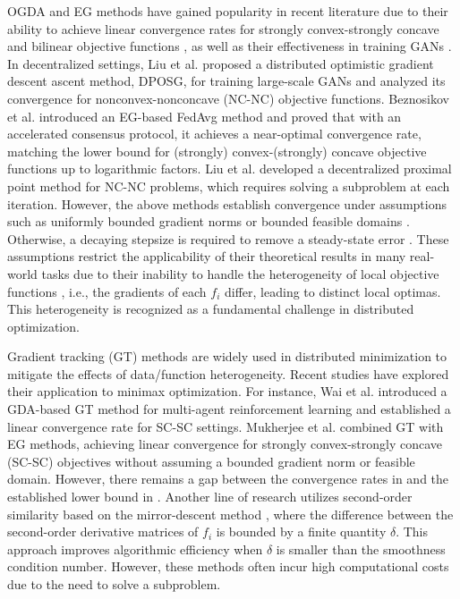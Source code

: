 \documentclass[10pt,a4paper]{amsart}
\begin{document}
OGDA and EG methods have gained popularity in recent literature due to their ability to achieve linear convergence rates for strongly convex-strongly concave and bilinear objective functions \cite{mokhtari2020unified, azizian2020tight}, as well as their effectiveness in training GANs \cite{daskalakis2017training, liang2019interaction}.
In decentralized settings, Liu et al. \cite{liu2020decentralized} proposed a distributed optimistic gradient descent ascent method, DPOSG, for training large-scale GANs and analyzed its convergence for nonconvex-nonconcave (NC-NC) objective functions.
Beznosikov et al. \cite{beznosikov2020distributed} introduced an EG-based FedAvg method and proved that with an accelerated consensus protocol, it achieves a near-optimal convergence rate, matching the lower bound for (strongly) convex-(strongly) concave objective functions up to logarithmic factors.
Liu et al. \cite{liu2019decentralized} developed a decentralized proximal point method for NC-NC problems, which requires solving a subproblem at each iteration.
However, the above methods establish convergence under assumptions such as uniformly bounded gradient norms \cite{liu2020decentralized} or bounded feasible domains \cite{liu2019decentralized, beznosikov2020distributed}. 
Otherwise, a decaying stepsize is required to remove a steady-state error \cite{cai2024diffusion}.
These assumptions restrict the applicability of their theoretical results in many real-world tasks due to their inability to handle the heterogeneity of local objective functions \cite{lian2017can}, i.e., the gradients of each $f_i$ differ, leading to distinct local optimas. This heterogeneity is recognized as a fundamental challenge in distributed optimization.

Gradient tracking (GT) methods \cite{xu2015augmented, pu2021distributed} are widely used in distributed minimization to mitigate the effects of data/function heterogeneity. Recent studies have explored their application to minimax optimization. For instance, Wai et al. \cite{wai2018multi} introduced a GDA-based GT method for multi-agent reinforcement learning and established a linear convergence rate for SC-SC settings.
Mukherjee et al. \cite{mukherjee2020decentralized} combined GT with EG methods, achieving linear convergence for strongly convex-strongly concave (SC-SC) objectives without assuming a bounded gradient norm or feasible domain. However, there remains a gap between the convergence rates in \cite{wai2018multi, mukherjee2020decentralized} and the established lower bound in \cite{beznosikov2020distributed}.
Another line of research utilizes second-order similarity based on the mirror-descent method \cite{sonata, beznosikov2021distributed, zhou2024near}, where the difference between the second-order derivative matrices of $f_i$ is bounded by a finite quantity $\delta$. This approach improves algorithmic efficiency when $\delta$ is smaller than the smoothness condition number. However, these methods often incur high computational costs due to the need to solve a subproblem.
\end{document}
